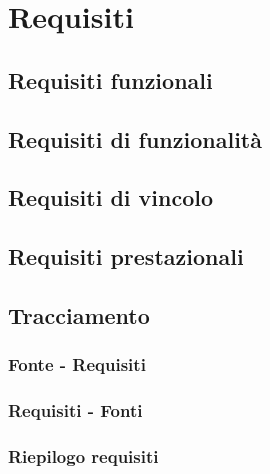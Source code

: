 \section{Requisiti}
\subsection{Requisiti funzionali}
\subsection{Requisiti di funzionalità}
\subsection{Requisiti di vincolo}
\subsection{Requisiti prestazionali}
\subsection{Tracciamento}
\subsubsection{Fonte - Requisiti}
\subsubsection{Requisiti - Fonti}
\subsubsection{Riepilogo requisiti}